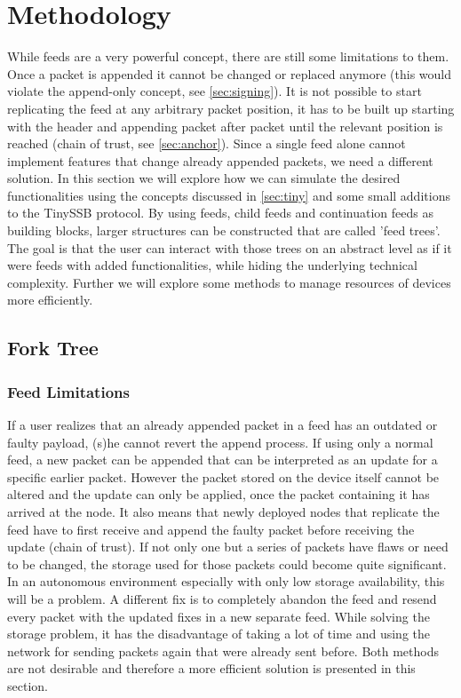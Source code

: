 \chapter{Methodology}

While feeds are a very powerful concept, there are still some limitations to them. Once a packet is appended it cannot be changed or replaced anymore (this would violate the append-only concept, see \cref{sec:signing}). It is not possible to start replicating the feed at any arbitrary packet position, it has to be built up starting with the header and appending packet after packet until the relevant position is reached (chain of trust, see \cref{sec:anchor}). Since a single feed alone cannot implement features that change already appended packets, we need a different solution. In this section we will explore how we can simulate the desired functionalities using the concepts discussed in \cref{sec:tiny} and some small additions to the TinySSB protocol. By using feeds, child feeds and continuation feeds as building blocks, larger structures can be constructed that are called 'feed trees'. The goal is that the user can interact with those trees on an abstract level as if it were feeds with added functionalities, while hiding the underlying technical complexity. Further we will explore some methods to manage resources of devices more efficiently.

\section{Fork Tree}
\label{sec:fork}
\subsection{Feed Limitations}
If a user realizes that an already appended packet in a feed has an outdated or faulty payload, (s)he cannot revert the append process. If using only a normal feed, a new packet can be appended that can be interpreted as an update for a specific earlier packet. However the packet stored on the device itself cannot be altered and the update can only be applied, once the packet containing it has arrived at the node. It also means that newly deployed nodes that replicate the feed have to first receive and append the faulty packet before receiving the update (chain of trust). If not only one but a series of packets have flaws or need to be changed, the storage used for those packets could become quite significant. In an autonomous environment especially with only low storage availability, this will be a problem. A different fix is to completely abandon the feed and resend every packet with the updated fixes in a new separate feed. While solving the storage problem, it has the disadvantage of taking a lot of time and using the network for sending packets again that were already sent before. Both methods are not desirable and therefore a more efficient solution is presented in this section.

